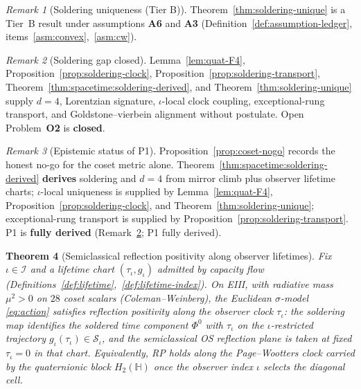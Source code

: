 \documentclass[11pt]{article}
\theoremstyle{plain}
\newtheorem{theorem}{Theorem}[section]
\theoremstyle{definition}
\theoremstyle{remark}
\newtheorem{remark}[theorem]{Remark}
\numberwithin{equation}{section}
\newcommand{\Quat}{\mathbb{H}}
\newcommand{\orderparam}{\Phi}
\begin{document}
\begin{remark}[Soldering uniqueness (Tier B)]
\label{rem:soldering-tier}
Theorem~\ref{thm:soldering-unique} is a Tier~B result under assumptions
\textbf{A6} and \textbf{A3} (Definition~\ref{def:assumption-ledger},
items~\ref{asm:convex},~\ref{asm:cw}).
\end{remark}

\begin{remark}[Soldering gap closed]
\label{rem:soldering-full-gap}
Lemma~\ref{lem:quat-F4}, Proposition~\ref{prop:soldering-clock},
Proposition~\ref{prop:soldering-transport},
Theorem~\ref{thm:spacetime:soldering-derived}, and
Theorem~\ref{thm:soldering-unique} supply $d=4$, Lorentzian signature,
$\iota$-local clock coupling, exceptional-rung transport, and
Goldstone--vierbein alignment without postulate. Open Problem~\textbf{O2} is
\textbf{closed}.
\end{remark}

\begin{remark}[Epistemic status of P1]
Proposition~\ref{prop:coset-nogo} records the honest no-go for the coset
metric alone. Theorem~\ref{thm:spacetime:soldering-derived} \textbf{derives}
soldering and $d=4$ from mirror climb plus observer lifetime charts;
$\iota$-local uniqueness is supplied by Lemma~\ref{lem:quat-F4},
Proposition~\ref{prop:soldering-clock}, and
Theorem~\ref{thm:soldering-unique}; exceptional-rung transport is supplied
by Proposition~\ref{prop:soldering-transport}. P1 is \textbf{fully derived}
(Remark~\ref{rem:soldering-full-gap}; P1 fully derived).
\end{remark}

\begin{theorem}[Semiclassical reflection positivity along observer lifetimes]
\label{thm:rp}
Fix $\iota\in\mathcal{I}$ and a lifetime chart
$(\tau_\iota,g_\iota)$ admitted by capacity flow
(Definitions~\ref{def:lifetime},~\ref{def:lifetime-index}). On EIII, with
radiative mass $\mu^2>0$ on $28$ coset scalars (Coleman--Weinberg), the
Euclidean $\sigma$-model \eqref{eq:action} satisfies reflection positivity
along the observer clock $\tau_\iota$: the soldering map identifies the
soldered time component $\orderparam^0$ with $\tau_\iota$ on the
$\iota$-restricted trajectory $g_\iota(\tau_\iota)\in\mathcal{S}_\iota$, and
the semiclassical OS reflection plane is taken at fixed $\tau_\iota=0$ in
that chart. Equivalently, RP holds along the Page--Wootters clock carried by
the quaternionic block $H_2(\Quat)$ once the observer index $\iota$ selects
the diagonal cell.
\end{theorem}
\end{document}
